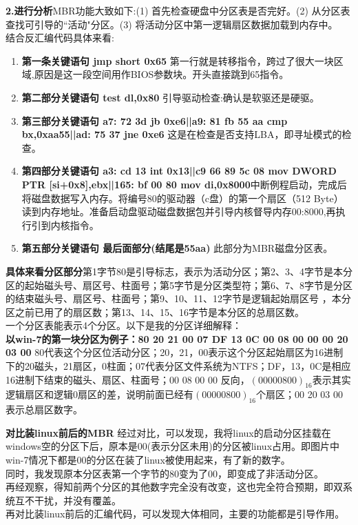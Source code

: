 \documentclass[]{report}
\begin{document}
{\bf 2.进行分析}MBR功能大致如下:(1) 首先检查硬盘中分区表是否完好。(2) 从分区表查找可引导的``活动"分区。(3) 将活动分区中第一逻辑扇区数据加载到内存中。\\
结合反汇编代码具体来看:
\begin{enumerate}
	\item{\bf 第一条关键语句 jmp short 0x65} 第一行就是转移指令，跨过了很大一块区域,原因是这一段空间用作BIOS参数块。开头直接跳到65指令。
	\item{\bf 第二部分关键语句 test dl,0x80} 引导驱动检查:确认是软驱还是硬驱。
	\item{\bf 第三部分关键语句 a7: 72 3d jb 0xe6||a9: 81 fb 55 aa  cmp  bx,0xaa55||ad: 75 37 jne 0xe6} 这是在检查是否支持LBA，即寻址模式的检查。
	\item{\bf 第四部分关键语句  a3: cd 13 int 0x13||c9 66 89 5c 08   mov DWORD PTR [si+0x8],ebx||165:   bf 00 80  mov di,0x8000}中断例程启动，完成后将磁盘数据写入内存。将编号80的驱动器（c盘）的第一个扇区（512 Byte）读到内存地址。准备启动盘驱动磁盘数据包并引导内核督导内存00:8000,再执行引到内核指令。
	\item{\bf 第五部分关键语句 最后面部分(结尾是55aa)} 此部分为MBR磁盘分区表。
\end{enumerate}
	{\bf 具体来看分区部分}第1字节80是引导标志，表示为活动分区；第2、3、4字节是本分区的起始磁头号、扇区号、柱面号；第5字节是分区类型符；第6、7、8字节是分区的结束磁头号、扇区号、柱面号；第9、10、11、12字节是逻辑起始扇区号 ，本分区之前已用了的扇区数；第13、14、15、16字节是本分区的总扇区数。\\
	一个分区表能表示4个分区。以下是我的分区详细解释：\\
	{\bf 以win-7的第一块分区为例子：80 20 21 00 07 DF 13 0C 00 08 00 00 00 20 03 00} 80代表这个分区位活动分区；20，21，00表示这个分区起始扇区为16进制下的20磁头，21扇区，0柱面；07代表分区文件系统为NTFS；DF，13，0C是相应16进制下结束的磁头、扇区、柱面号；00 08 00 00 反向，$(00 00 08 00)_{16}$表示其实逻辑扇区和逻辑0扇区的差，说明前面已经有$(00 00 08 00)_{16}$个扇区；00 20 03 00表示总扇区数字。

{\bf 对比装linux前后的MBR} 经过对比，可以发现，我将linux的启动分区挂载在windows空的分区下后，原本是00(表示分区未用)的分区被linux占用。即图片中win-7情况下都是00的分区在装了linux被使用起来，有了新的数字。\\
	同时，我发现原本分区表第一个字节的80变为了00，即变成了非活动分区。\\
	再经观察，得知前两个分区的其他数字完全没有改变，这也完全符合预期，即双系统互不干扰，并没有覆盖。\\
	再对比装linux前后的汇编代码，可以发现大体相同，主要的功能都是引导作用。	
	
\end{document}
